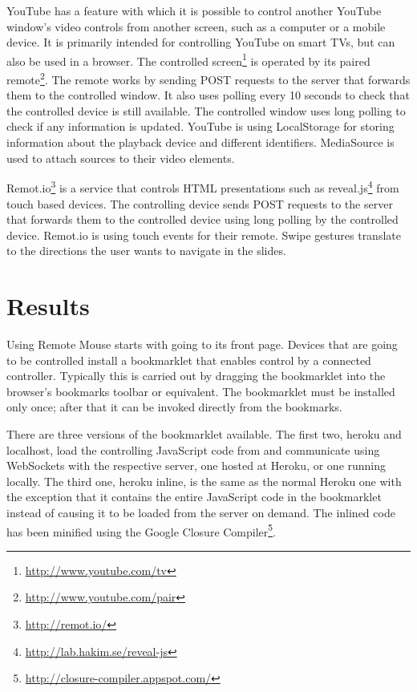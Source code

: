 \documentclass[a4paper,english,twocolumn]{article}
\begin{document}
YouTube has a feature with which it is possible to control another
YouTube window's video controls from another screen, such as a
computer or a mobile device. It is primarily intended for controlling
YouTube on smart TVs, but can also be used in a browser. The
controlled screen\footnote{\url{http://www.youtube.com/tv}} is
operated by its paired
remote\footnote{\url{http://www.youtube.com/pair}}. The remote works
by sending POST requests to the server that forwards them to the
controlled window. It also uses polling every 10 seconds to check that
the controlled device is still available. The controlled window uses
long polling to check if any information is updated. YouTube is using
LocalStorage for storing information about the playback device and
different identifiers. MediaSource is used to attach sources to their
video elements.

Remot.io\footnote{\url{http://remot.io/}} is a service that controls
HTML presentations such as
reveal.js\footnote{\url{http://lab.hakim.se/reveal-js}} from touch
based devices. The controlling device sends POST requests to the
server that forwards them to the controlled device using long polling
by the controlled device. Remot.io is using touch events for their
remote. Swipe gestures translate to the directions the user wants to
navigate in the slides.

\section{Results}

Using Remote Mouse starts with going to its front page. Devices that
are going to be controlled install a bookmarklet that enables control
by a connected controller. Typically this is carried out by dragging
the bookmarklet into the browser's bookmarks toolbar or
equivalent. The bookmarklet must be installed only once; after that it
can be invoked directly from the bookmarks.

There are three versions of the bookmarklet available. The first two,
heroku and localhost, load the controlling JavaScript code from and
communicate using WebSockets with the respective server, one hosted at
Heroku, or one running locally. The third one, heroku inline, is the
same as the normal Heroku one with the exception that it contains the
entire JavaScript code in the bookmarklet instead of causing it to be
loaded from the server on demand. The inlined code has been minified
using the Google Closure
Compiler\footnote{\url{http://closure-compiler.appspot.com/}}.
\end{document}

